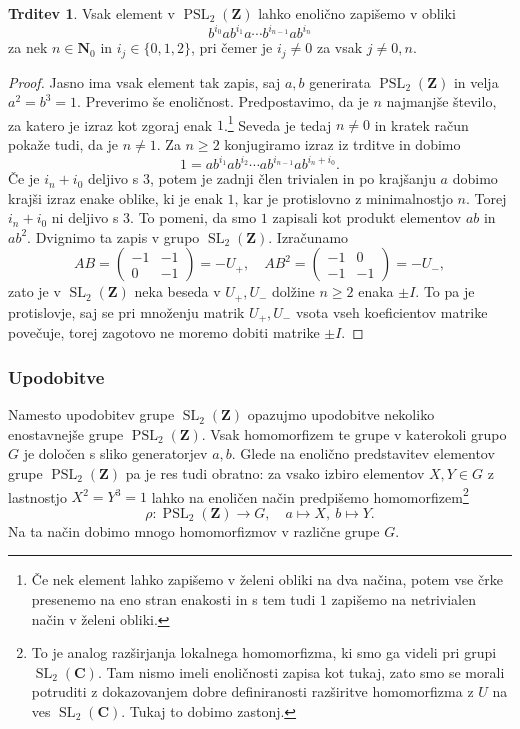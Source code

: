 \documentclass[11pt]{book}
\def\NN{\mathbf{N}}
\def\ZZ{\mathbf{Z}}
\def\CC{\mathbf{C}}
\DeclareMathOperator\SL{SL}
\DeclareMathOperator\PSL{PSL}
\theoremstyle{definition}
\theoremstyle{zgled}
\theoremstyle{odprtproblem}
\theoremstyle{domacanaloga}
\newenvironment{dokaz}
    {\color{siva}\begin{proof}}
    {\end{proof}}
\theoremstyle{izrek}
\newtheorem*{trditev}{Trditev}
\begin{document}
\begin{trditev}
Vsak element v $\PSL_2(\ZZ)$ lahko enolično zapišemo v obliki
\[
    b^{i_0} a b^{i_1} a \cdots b^{i_{n-1}} a b^{i_n}
\]
za nek $n \in \NN_0$ in $i_j \in \{0,1,2 \}$, pri čemer je $i_j \neq 0$ za vsak $j \neq 0,n$.
\end{trditev}
\begin{dokaz}
Jasno ima vsak element tak zapis, saj $a,b$ generirata $\PSL_2(\ZZ)$ in velja $a^2 = b^3 = 1$. Preverimo še enoličnost. Predpostavimo, da je $n$ najmanjše število, za katero je izraz kot zgoraj enak $1$.\footnote{Če nek element lahko zapišemo v želeni obliki na dva načina, potem vse črke presenemo na eno stran enakosti in s tem tudi $1$ zapišemo na netrivialen način v želeni obliki.} Seveda je tedaj $n \neq 0$ in kratek račun pokaže tudi, da je $n \neq 1$. Za $n \geq 2$ konjugiramo izraz iz trditve in dobimo
\[
    1 = a b^{i_1} a b^{i_2} \cdots a b^{i_{n-1}} a b^{i_n + i_0}.
\]
Če je $i_n + i_0$ deljivo s $3$, potem je zadnji člen trivialen in po krajšanju $a$ dobimo krajši izraz enake oblike, ki je enak $1$, kar je protislovno z minimalnostjo $n$. Torej $i_n + i_0$ ni deljivo s $3$. To pomeni, da smo $1$ zapisali kot produkt elementov $ab$ in $ab^2$. Dvignimo ta zapis v grupo $\SL_2(\ZZ)$. Izračunamo
\[
    AB = \begin{pmatrix}
        -1 & -1 \\ 0 & -1
    \end{pmatrix}
    = - U_+, \quad
    AB^2 = \begin{pmatrix}
        -1 & 0 \\ -1 & -1
    \end{pmatrix}
    = - U_-,
\]
zato je v $\SL_2(\ZZ)$ neka beseda v $U_+, U_-$ dolžine $n \geq 2$ enaka $\pm I$. To pa je protislovje, saj se pri množenju matrik $U_+, U_-$ vsota vseh koeficientov matrike povečuje, torej zagotovo ne moremo dobiti matrike $\pm I$.
\end{dokaz}

\subsubsection{Upodobitve}

Namesto upodobitev grupe $\SL_2(\ZZ)$ opazujmo upodobitve nekoliko enostavnejše grupe $\PSL_2(\ZZ)$. Vsak homomorfizem te grupe v katerokoli grupo $G$ je določen s sliko generatorjev $a,b$. Glede na enolično predstavitev elementov grupe $\PSL_2(\ZZ)$ pa je res tudi obratno: za vsako izbiro elementov $X,Y \in G$ z lastnostjo $X^2 = Y^3 = 1$ lahko na enoličen način predpišemo homomorfizem\footnote{To je analog razširjanja lokalnega homomorfizma, ki smo ga videli pri grupi $\SL_2(\CC)$. Tam nismo imeli enoličnosti zapisa kot tukaj, zato smo se morali potruditi z dokazovanjem dobre definiranosti razširitve homomorfizma z $U$ na ves $\SL_2(\CC)$. Tukaj to dobimo zastonj.}
\[
    \textstyle \rho 
    \colon \PSL_2(\ZZ) \to G, \quad
    a \mapsto X, \ b \mapsto Y.
\]
Na ta način dobimo mnogo homomorfizmov v različne grupe $G$.
\end{document}
